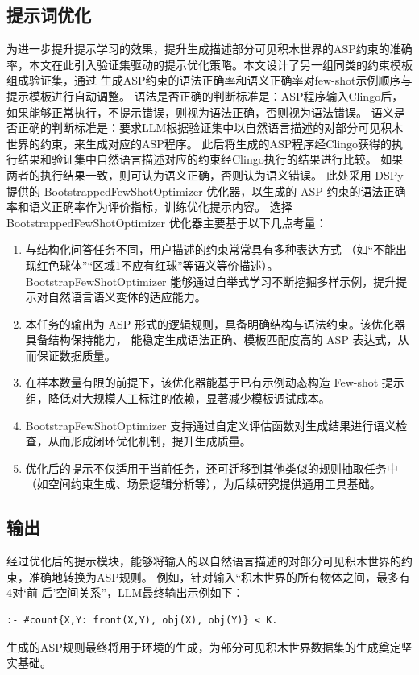 \subsection{提示词优化}
为进一步提升提示学习的效果，提升生成描述部分可见积木世界的ASP约束的准确率，本文在此引入验证集驱动的提示优化策略。本文设计了另一组同类的约束模板组成验证集，通过
生成ASP约束的语法正确率和语义正确率对few-shot示例顺序与提示模板进行自动调整。
语法是否正确的判断标准是：ASP程序输入Clingo后，如果能够正常执行，不提示错误，则视为语法正确，否则视为语法错误。
语义是否正确的判断标准是：要求LLM根据验证集中以自然语言描述的对部分可见积木世界的约束，来生成对应的ASP程序。
此后将生成的ASP程序经Clingo获得的执行结果和验证集中自然语言描述对应的约束经Clingo执行的结果进行比较。
如果两者的执行结果一致，则可认为语义正确，否则认为语义错误。
此处采用 DSPy 提供的 BootstrappedFewShotOptimizer 优化器，以生成的 ASP 约束的语法正确率和语义正确率作为评价指标，训练优化提示内容。
选择 BootstrappedFewShotOptimizer 优化器主要基于以下几点考量：
\begin{enumerate}[nosep]
\item 与结构化问答任务不同，用户描述的约束常常具有多种表达方式
（如“不能出现红色球体”“区域1不应有红球”等语义等价描述）。BootstrapFewShotOptimizer 
能够通过自举式学习不断挖掘多样示例，提升提示对自然语言语义变体的适应能力。
\item 本任务的输出为 ASP 形式的逻辑规则，具备明确结构与语法约束。该优化器具备结构保持能力，
能稳定生成语法正确、模板匹配度高的 ASP 表达式，从而保证数据质量。
\item 在样本数量有限的前提下，该优化器能基于已有示例动态构造 Few-shot 提示组，降低对大规模人工标注的依赖，显著减少模板调试成本。
\item BootstrapFewShotOptimizer 支持通过自定义评估函数对生成结果进行语义检查，从而形成闭环优化机制，提升生成质量。
\item 优化后的提示不仅适用于当前任务，还可迁移到其他类似的规则抽取任务中（如空间约束生成、场景逻辑分析等），为后续研究提供通用工具基础。
\end{enumerate}
\subsection{输出}
经过优化后的提示模块，能够将输入的以自然语言描述的对部分可见积木世界的约束，准确地转换为ASP规则。
例如，针对输入“积木世界的所有物体之间，最多有4对‘前-后’空间关系”，LLM最终输出示例如下：
\begin{lstlisting}
:- #count{X,Y: front(X,Y), obj(X), obj(Y)} < K.
\end{lstlisting}
生成的ASP规则最终将用于环境的生成，为部分可见积木世界数据集的生成奠定坚实基础。
